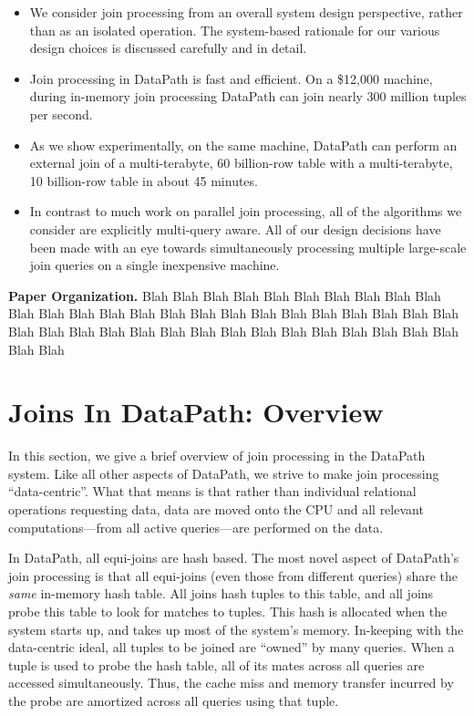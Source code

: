 \documentclass{sig-alternate}
\renewcommand\:{\colon} %
\begin{document}
\begin{itemize} 

\item We consider
join processing from an overall system design perspective, rather than as an isolated operation.
The system-based rationale for our various design choices is discussed carefully and in detail.

\item Join processing in DataPath is fast and efficient.
On a \$12,000 machine, during in-memory join processing DataPath can join nearly 300 million tuples per second.

\item As we show experimentally, on the same machine, DataPath can perform an external join of a multi-terabyte,
60 billion-row table with a multi-terabyte, 10 billion-row table in about 45 minutes.

\item In contrast to much work on parallel join processing, all of the algorithms we consider are explicitly multi-query aware.
All of our design decisions have been made with an eye towards simultaneously processing multiple large-scale join queries on a single
inexpensive machine.

\end{itemize}

\vspace{5 pt}
\noindent
\textbf{Paper Organization.}
Blah Blah Blah
Blah Blah Blah
Blah Blah Blah
Blah Blah Blah
Blah Blah Blah
Blah Blah Blah
Blah Blah Blah
Blah Blah Blah
Blah Blah Blah
Blah Blah Blah
Blah Blah Blah
Blah Blah Blah
Blah Blah Blah
Blah Blah Blah

\section{Joins In DataPath: Overview}

In this section, we give a brief overview of join processing in the DataPath system. 
Like all other aspects of DataPath, we strive to make join processing ``data-centric''.  What that means is that rather than
individual relational operations requesting data,
data are moved onto the CPU and all relevant computations---from all active queries---are 
performed on the data.  

In DataPath, all equi-joins are hash based. 
The most novel aspect of DataPath's join processing is that 
all equi-joins 
(even those from different queries)
share the \emph{same} in-memory hash table.  
All joins hash tuples to this table, and all joins probe this table to look for matches to tuples.
This hash is allocated when the system starts up, and takes up most of
the system's memory.  
In-keeping with the data-centric ideal, all tuples to be joined are ``owned'' by many queries.  When a tuple is
used to probe the hash table, all of its mates across all queries are accessed simultaneously.
Thus, the cache miss and memory transfer incurred by the probe are amortized across all queries using that tuple.
\end{document}
